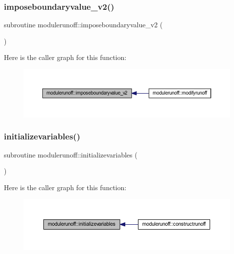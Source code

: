 \subsubsection{\texorpdfstring{imposeboundaryvalue\+\_\+v2()}{imposeboundaryvalue\_v2()}}
{\footnotesize\ttfamily subroutine modulerunoff\+::imposeboundaryvalue\+\_\+v2 (\begin{DoxyParamCaption}{ }\end{DoxyParamCaption})\hspace{0.3cm}{\ttfamily [private]}}

Here is the caller graph for this function\+:\nopagebreak
\begin{figure}[H]
\begin{center}
\leavevmode
\includegraphics[width=350pt]{namespacemodulerunoff_acf9771f898b15e849b1eaba077dd0d83_icgraph}
\end{center}
\end{figure}
\mbox{\label{namespacemodulerunoff_a99a2963d7ce8cb790b9fa53c6c936329}} 
\subsubsection{\texorpdfstring{initializevariables()}{initializevariables()}}
{\footnotesize\ttfamily subroutine modulerunoff\+::initializevariables (\begin{DoxyParamCaption}{ }\end{DoxyParamCaption})\hspace{0.3cm}{\ttfamily [private]}}

Here is the caller graph for this function\+:\nopagebreak
\begin{figure}[H]
\begin{center}
\leavevmode
\includegraphics[width=350pt]{namespacemodulerunoff_a99a2963d7ce8cb790b9fa53c6c936329_icgraph}
\end{center}
\end{figure}
\mbox{\label{namespacemodulerunoff_ad94c220c4dbba10ee5046785e9e782e9}} 
